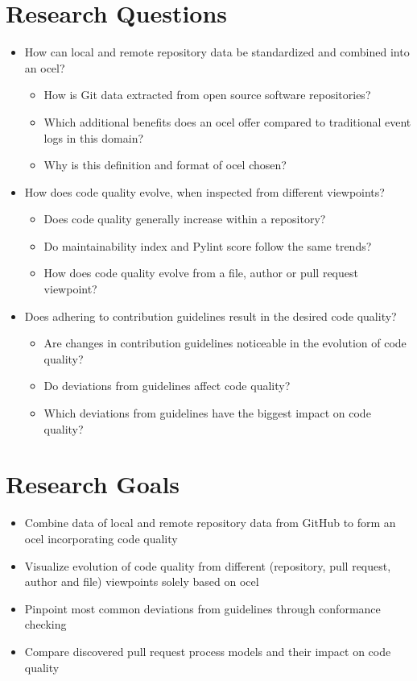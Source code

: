 \section{Research Questions}
\label{sec:intro_ssec:rqs}
\begin{itemize}
	\item How can local and remote repository data be standardized and combined into an \ac{ocel}?
	\begin{itemize}
		\item How is Git data extracted from open source software repositories?
		\item Which additional benefits does an \ac{ocel} offer compared to traditional event logs in this domain?
		\item Why is this definition and format of \ac{ocel} chosen?
	\end{itemize}
	\item How does code quality evolve, when inspected from different viewpoints?
	\begin{itemize}
		\item Does code quality generally increase within a repository?
		\item Do maintainability index and Pylint score follow the same trends?
		\item How does code quality evolve from a file, author or pull request viewpoint?
	\end{itemize}
	\item Does adhering to contribution guidelines result in the desired code quality?
	\begin{itemize}
		\item Are changes in contribution guidelines noticeable in the evolution of code quality?
		\item Do deviations from guidelines affect code quality?
		\item Which deviations from guidelines have the biggest impact on code quality?
	\end{itemize}
\end{itemize}

\section{Research Goals}
\label{sec:intro_ssec:rgs}
\begin{itemize}
	\item Combine data of local and remote repository data from GitHub to form an \ac{ocel} incorporating code quality
	\item Visualize evolution of code quality from different (repository, pull request, author and file) viewpoints solely based on \ac{ocel}
	\item Pinpoint most common deviations from guidelines through conformance checking 
	\item Compare discovered pull request process models and their impact on code quality
\end{itemize}


